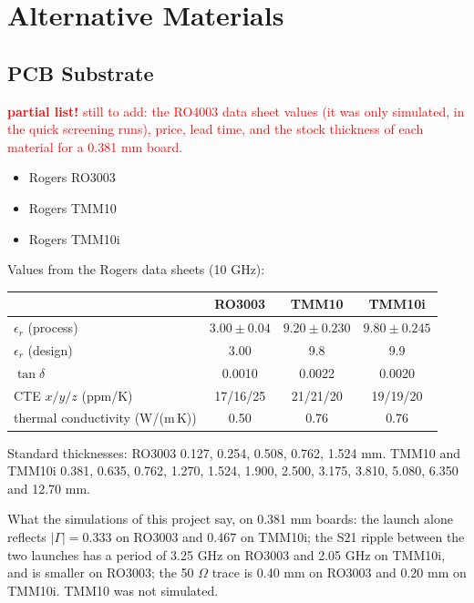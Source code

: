 \section{Alternative Materials}
\subsection{PCB Substrate
\label{subsec:PCBsubstrateAlt}}
\textcolor{red}{\textbf{partial list!} still to add: the RO4003 data sheet values (it was only simulated, in the quick screening runs), price, lead time, and the stock thickness of each material for a 0.381 mm board.}
\begin{itemize}
    \item Rogers RO3003
    \item Rogers TMM10
    \item Rogers TMM10i
\end{itemize}
Values from the Rogers data sheets (10 GHz):
\begin{center}
\small
\begin{tabular}{l|ccc}
\toprule
 & RO3003 & TMM10 & TMM10i \\ \midrule
$\epsilon_r$ (process) & $3.00\pm0.04$ & $9.20\pm0.230$ & $9.80\pm0.245$ \\
$\epsilon_r$ (design) & 3.00 & 9.8 & 9.9 \\
$\tan\delta$ & 0.0010 & 0.0022 & 0.0020 \\
CTE $x/y/z$ (ppm/K) & 17/16/25 & 21/21/20 & 19/19/20 \\
thermal conductivity (W/(m\,K)) & 0.50 & 0.76 & 0.76 \\
\bottomrule
\end{tabular}
\end{center}
Standard thicknesses: RO3003 0.127, 0.254, 0.508, 0.762, 1.524 mm. TMM10 and TMM10i 0.381, 0.635, 0.762, 1.270, 1.524, 1.900, 2.500, 3.175, 3.810, 5.080, 6.350 and 12.70 mm.\par
\noindent What the simulations of this project say, on 0.381 mm boards: the launch alone reflects $|\Gamma| = 0.333$ on RO3003 and $0.467$ on TMM10i; the S21 ripple between the two launches has a period of 3.25 GHz on RO3003 and 2.05 GHz on TMM10i, and is smaller on RO3003; the 50 $\Omega$ trace is 0.40 mm on RO3003 and 0.20 mm on TMM10i. TMM10 was not simulated.

